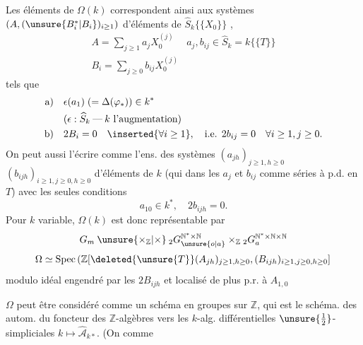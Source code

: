 Les  éléments de $\Omega(k)$ correspondent
ainsi aux systèmes $(A,(\unsure{B_i^*|B_i})_{i\geq1})$ d'éléments
de $\widehat S_k\{\{X_0\}\}$ ,
\[
 \begin{array}{l|l}
 A=\displaystyle\sum_{j\geq1}a_jX_0^{(j)}&a_j,b_{ij}\in\widehat S_k=k\{\{T\}\}\\
 B_i=\displaystyle\sum_{j\geq0}b_{ij}X_0^{(j)}&
 \end{array}
\]
tels que
\[
 \begin{aligned}
 \text{a)}\quad&\epsilon(a_1)\;(=\Delta(\varphi_*))\in k^*\\
 &(\epsilon:\widehat S_k\mathbin{\text{---}}k\text{ l'augmentation})\\
 \text{b)}\quad&2B_i=0\quad\inserted{\forall i\geq1},\quad\text{i.e. }2b_{ij}=0
 \quad\forall i\geq1,j\geq0.
 \end{aligned}
\]
On peut aussi l'écrire comme l'ens. des systèmes
$(a_{jh})_{j\geq1,h\geq0}$ $(b_{ijh})_{i\geq1,j\geq0,h\geq0}$
d'éléments de $k$ (qui  dans les
$a_j$ et $b_{ij}$ comme séries à p.d. en $T$) avec les seules conditions
\[
 a_{10}\in k^*,\quad 2b_{ijh}=0.
\]
Pour $k$ variable,  $\Omega(k)$ est donc
représentable par 
\[
 G_m\mathbin{\unsure{\times_{\mathbb Z}|\times}}
 {}_2G_{\unsure{o|a}}^{\mathbb N^*\times\mathbb N}\times_{\mathbb Z}{}_2G_a^{\mathbb N^*\times\mathbb N\times\mathbb N}
\]
\[
 \Omega\simeq\operatorname{Spec}\left(
 \mathbb Z[\deleted{\unsure{T}}(A_{jh})_{j\geq1,h\geq0},
 (B_{ijh})_{i\geq1,j\geq0,h\geq0}]
 \right.
\]
modulo idéal engendré par les $2B_{ijh}$ et localisé de plus p.r. à $A_{1,0}$

 $\Omega$ peut être considéré comme un schéma
en groupes sur $\mathbb Z$, qui est le schéma.
des autom. du foncteur des $\mathbb Z$-algèbres
vers les $k$-alg. différentielles $\unsure{\tfrac12}$-simpliciales
$k\longmapsto\widehat{\mathcal A}_{k*}$. (On  comme 
